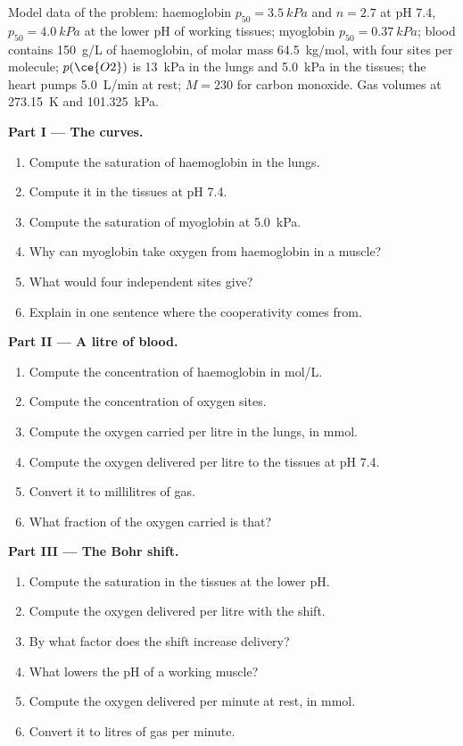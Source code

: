 \begin{problem}
\label{pb:b3:bioinorganic:1}
Model data of the problem: haemoglobin $p_{50} = \qty{3.5}{kPa}$ and $n = 2.7$ at pH 7.4, $p_{50} = \qty{4.0}{kPa}$ at the
lower pH of working tissues; myoglobin $p_{50} = \qty{0.37}{kPa}$; blood contains \qty{150}{g/L} of
haemoglobin, of molar mass \qty{64.5}{kg/mol}, with four sites per molecule; $p(\ce{O2})$ is \qty{13}{kPa}
in the lungs and \qty{5.0}{kPa} in the tissues; the heart pumps \qty{5.0}{L/min} at rest;
$M = 230$ for carbon monoxide. Gas volumes at \qty{273.15}{K} and \qty{101.325}{kPa}.

\medskip\noindent\textbf{Part I --- The curves.}
\begin{enumerate}
  \item Compute the saturation of haemoglobin in the lungs.
  \item Compute it in the tissues at pH 7.4.
  \item Compute the saturation of myoglobin at \qty{5.0}{kPa}.
  \item Why can myoglobin take oxygen from haemoglobin in a muscle?
  \item What  would four independent sites give?
  \item Explain in one sentence where the cooperativity comes from.
\end{enumerate}

\medskip\noindent\textbf{Part II --- A litre of blood.}
\begin{enumerate}[resume]
  \item Compute the concentration of haemoglobin in mol/L.
  \item Compute the concentration of oxygen sites.
  \item Compute the oxygen carried per litre in the lungs, in mmol.
  \item Compute the oxygen delivered per litre to the tissues at pH 7.4.
  \item Convert it to millilitres of gas.
  \item What fraction of the oxygen carried is that?
\end{enumerate}

\medskip\noindent\textbf{Part III --- The Bohr shift.}
\begin{enumerate}[resume]
  \item Compute the saturation in the tissues at the lower pH.
  \item Compute the oxygen delivered per litre with the shift.
  \item By what factor does the shift increase delivery?
  \item What lowers the pH of a working muscle?
  \item Compute the oxygen delivered per minute at rest, in mmol.
  \item Convert it to litres of gas per minute.
\end{enumerate}


\end{problem}
